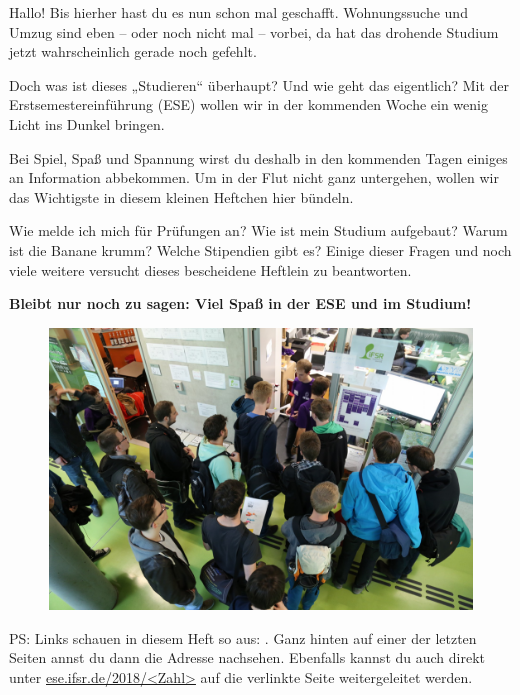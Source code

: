 

Hallo! Bis hierher hast du es nun schon mal geschafft. Wohnungssuche und Umzug sind eben -- oder noch nicht mal -- vorbei, da hat das drohende Studium jetzt wahrscheinlich gerade noch gefehlt.

Doch was ist dieses „Studieren“ überhaupt? Und wie geht das eigentlich? Mit der Erstsemestereinführung (ESE) wollen wir in der kommenden Woche ein wenig Licht ins Dunkel bringen.



Bei Spiel, Spaß und Spannung wirst du deshalb in den kommenden Tagen einiges an Information abbekommen. Um in der Flut nicht ganz untergehen, wollen wir das Wichtigste in diesem kleinen Heftchen hier bündeln.

Wie melde ich mich für Prüfungen an?  Wie ist mein Studium aufgebaut? Warum ist die Banane krumm? Welche Stipendien gibt es?
Einige dieser Fragen und noch viele weitere versucht dieses bescheidene Heftlein zu beantworten. %

\textbf{Bleibt nur noch zu sagen: Viel Spaß in der ESE und im Studium!}

\begin{figure}[b!]
	\centering
	\includegraphics[trim={0 5.5cm 0 0}, clip, width=\linewidth]{img/ese2015/bueroansturm.jpg}
\end{figure}%

\bigskip
{\small PS: Links schauen in diesem Heft so aus: . Ganz hinten auf einer der letzten Seiten annst du dann die Adresse nachsehen. Ebenfalls kannst du auch direkt unter \url{ese.ifsr.de/2018/<Zahl>} auf die verlinkte Seite weitergeleitet werden.}
